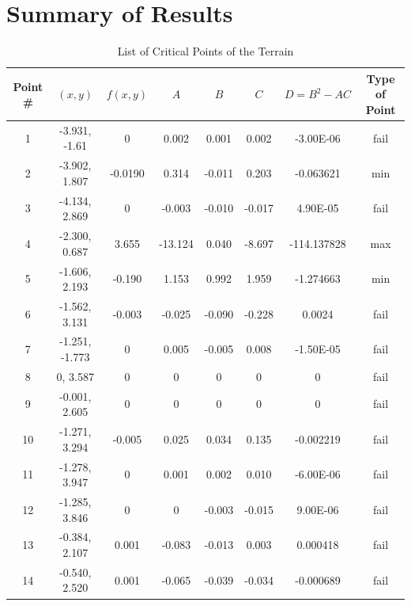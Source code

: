 \documentclass[12pt,onecolumn]{article}
\begin{document}
\section{Summary of Results}
\begin{table}[H]
\caption {List of Critical Points of the Terrain} \label{crit} 
\begin{tabular}{|c|c|c|c|c|c|c|c|}
\hline
Point \# & $(x, y)$       & $f(x,y)$ & $A$     & $B$    & $C$    & $D = B^2 - AC$ & Type of Point \\ \hline \hline
1        & -3.931, -1.61  & 0        & 0.002   & 0.001  & 0.002  & -3.00E-06      & fail          \\ \hline
2        & -3.902, 1.807  & -0.0190  & 0.314   & -0.011 & 0.203  & -0.063621      & min           \\ \hline
3        & -4.134, 2.869  & 0        & -0.003  & -0.010 & -0.017 & 4.90E-05       & fail          \\ \hline
4        & -2.300, 0.687  & 3.655    & -13.124 & 0.040  & -8.697 & -114.137828    & max           \\ \hline
5        & -1.606, 2.193  & -0.190   & 1.153   & 0.992  & 1.959  & -1.274663      & min           \\ \hline
6        & -1.562, 3.131  & -0.003   & -0.025  & -0.090 & -0.228 & 0.0024         & fail          \\ \hline
7        & -1.251, -1.773 & 0        & 0.005   & -0.005 & 0.008  & -1.50E-05      & fail          \\ \hline
8        & 0, 3.587       & 0        & 0       & 0      & 0      & 0              & fail          \\ \hline
9        & -0.001, 2.605  & 0        & 0       & 0      & 0      & 0              & fail          \\ \hline
10       & -1.271, 3.294  & -0.005   & 0.025   & 0.034  & 0.135  & -0.002219      & fail          \\ \hline
11       & -1.278, 3.947  & 0        & 0.001   & 0.002  & 0.010  & -6.00E-06      & fail          \\ \hline
12       & -1.285, 3.846  & 0        & 0       & -0.003 & -0.015 & 9.00E-06       & fail          \\ \hline
13       & -0.384, 2.107  & 0.001    & -0.083  & -0.013 & 0.003  & 0.000418       & fail          \\ \hline
14       & -0.540, 2.520  & 0.001    & -0.065  & -0.039 & -0.034 & -0.000689      & fail          \\ \hline

\end{tabular}
\end{table}
\end{document}
